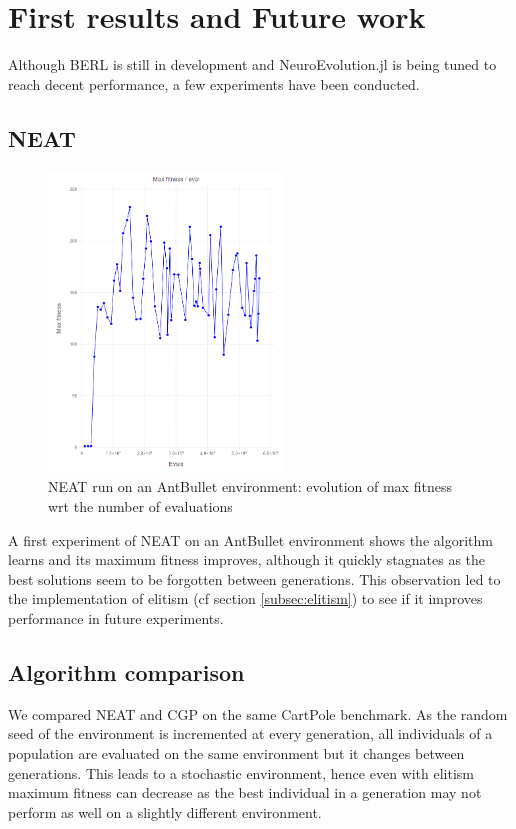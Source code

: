 \chapter{First results and Future work}
\label{chap:results}

Although BERL is still in development and NeuroEvolution.jl is being tuned to reach decent performance, a few experiments have been conducted. 

\section{NEAT}

\begin{figure}[H]
\centering
\captionsetup{justification=centering,margin=2cm}
\includegraphics[height=8cm]{images/neat_antbullet.PNG}
\caption{NEAT run on an AntBullet environment: evolution of max fitness wrt the number of evaluations}
\end{figure}

A first experiment of NEAT on an AntBullet environment shows the algorithm learns and its maximum fitness improves, although it quickly stagnates as the best solutions seem to be forgotten between generations. This observation led to the implementation of elitism (cf section \ref{subsec:elitism}) to see if it improves performance in future experiments.

\section{Algorithm comparison}

We compared NEAT and CGP on the same CartPole benchmark. As the random seed of the environment is incremented at every generation, all individuals of a population are evaluated on the same environment but it changes between generations. This leads to a stochastic environment, hence even with elitism maximum fitness can decrease as the best individual in a generation may not perform as well on a slightly different environment. 

